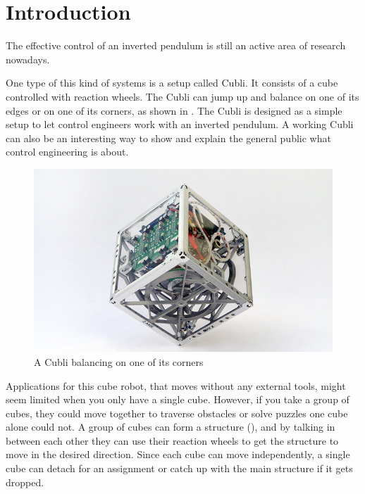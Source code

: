 \chapter{Introduction}\label{introduction}
The effective control of an inverted pendulum is still an active area of research nowadays. \cite{JHuber}

One type of this kind of systems is a setup called Cubli. It consists of a cube controlled with reaction wheels. The Cubli can jump up and balance on one of its edges or on one of its corners, as shown in .
The Cubli is designed as a simple setup to let control engineers work with an inverted pendulum. A working Cubli can also be an interesting way to show and explain the general public  what control engineering is about. \cite{MGajamohan}
%
\begin{figure}[H] 
	\centering
	\includegraphics[scale=1.3]{figures/CubliCorner-700x430}
	\caption{A Cubli balancing on one of its corners \cite{RAndrea}}
	\label{CubliCorner}
\end{figure}
%
Applications for this cube robot, that moves without any external tools, might seem limited when you only have a single cube. However, if you take a group of cubes, they could move together to traverse obstacles or solve puzzles one cube alone could not. A group of cubes can form a structure (), and by talking in between each other they can use their reaction wheels to get the structure to move in the desired direction. Since each cube can move independently, a single cube can detach for an assignment or catch up with the main structure if it gets dropped. \cite{JRomanishin}
%
